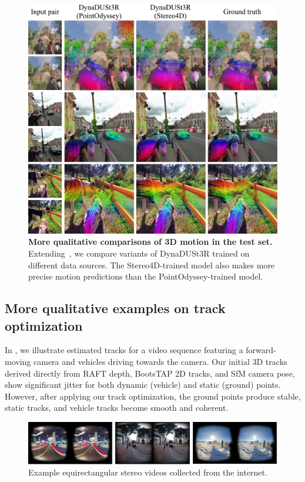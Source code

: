\begin{figure}[ht]
    \centering
    \includegraphics[width=\textwidth]{fig/supp/qualitative_comparison_on_motion_stereo4d.pdf}
    \caption{\textbf{More qualitative comparisons of 3D motion in the \dataset test set.} Extending~, we compare variants of DynaDUSt3R trained on different data sources. The Stereo4D-trained model also makes more precise motion predictions than the PointOdyssey-trained model.}
\label{fig:supp:compare-stereo4d}
\end{figure}



\subsection{More qualitative examples on track optimization}
In , we illustrate estimated tracks for a video sequence featuring a forward-moving camera and vehicles driving towards the camera. Our initial 3D tracks derived directly from RAFT depth, BootsTAP 2D tracks, and SfM camera pose, show significant jitter for both dynamic (vehicle) and static (ground) points. 
However, after applying our track optimization, the ground points produce stable, static tracks, and vehicle tracks become smooth and coherent. 

\begin{figure}[ht]
    \centering
    \includegraphics[width=\textwidth]{fig/supp/equirect-sample.pdf}
    \caption{Example equirectangular stereo videos collected from the internet.}
    \label{fig:supp:equirect}
\end{figure}


